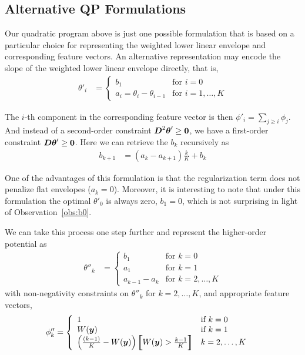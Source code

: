 \documentclass[10pt,journal,letterpaper,compsoc]{IEEEtran}
\begin{document}
\subsection{Alternative QP Formulations}
\label{sec:alternative_qp}

Our quadratic program above is just one possible formulation that is
based on a particular choice for representing the weighted lower
linear envelope and corresponding feature vectors. An alternative
representation may encode the slope of the weighted lower linear
envelope directly, that is,
%
\begin{align}
  \theta'_i &= \left\{ \begin{array}{ll}
    b_1 & \textrm{for $i = 0$} \\
    a_i = \theta_{i} - \theta_{i-1} & \textrm{for $i = 1, \ldots, K$}
  \end{array} \right.
\end{align}
%

The $i$-th component in the corresponding feature vector is then
$\phi'_i = \sum_{j \geq i} \phi_j$. And instead of a second-order
constraint ${\boldsymbol{D}}^2 \boldsymbol{\theta}' \geq \textbf{0}$, we have a first-order
constraint ${\boldsymbol{D}} \boldsymbol{\theta}' \geq \textbf{0}$. Here we can retrieve the $b_k$
recursively as
%
\begin{align}
  b_{k+1} &= (a_k - a_{k+1}) \frac{k}{K} + b_k
  \label{eqn:bk}
\end{align}

One of the advantages of this formulation is that the regularization
term does not penalize flat envelopes (\ie $a_k = 0$). Moreover, it is
interesting to note that under this formulation the optimal
$\theta'_0$ is always zero, \ie $b_1 = 0$, which is not surprising in
light of Observation~\ref{obs:b0}.

We can take this process one step further and represent the
higher-order potential as
%
\begin{align}
  \theta''_k &= \left\{ \begin{array}{ll}
    b_1 & \textrm{for $k = 0$} \\
    a_1 & \textrm{for $k = 1$} \\
    a_{k-1} - a_{k} & \textrm{for $k = 2, \ldots, K$}
  \end{array} \right.
\end{align}
%
with non-negativity constraints on $\theta''_k$ for $k = 2,
\ldots, K$, and appropriate feature vectors, \ie
%
\begin{align}
  \phi''_k &= \left\{ \begin{array}{ll}
    1 & \textrm{if $k = 0$} \\
    W(\by) & \textrm{if $k = 1$} \\
    \left(\frac{(k - 1)}{K} - W(\by)\right)\bigind{W(\by) > \frac{k-1}{K}} & \textrm{$k = 2, \ldots, K$}
  \end{array} \right.
\end{align}
\end{document}
